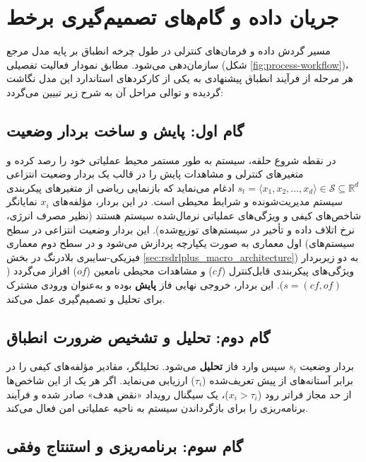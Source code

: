 \documentclass[oneside,openany,phd]{TMU-Thesis}
\begin{document}
\section{جریان داده و گام‌های تصمیم‌گیری برخط}
\label{sec:online-decision}

مسیر گردش داده و فرمان‌های کنترلی در طول چرخه انطباق بر پایه مدل مرجع  \cite{kephart2003vision} سازمان‌دهی می‌شود. مطابق نمودار فعالیت تفصیلی (شکل \ref{fig:process-workflow})، هر مرحله از فرآیند انطباق پیشنهادی به یکی از کارکردهای استاندارد این مدل نگاشت گردیده و توالی مراحل آن به شرح زیر تبیین می‌گردد:

\subsection{گام اول: پایش و ساخت بردار وضعیت}
\label{subsec:monitoring-feature}

در نقطه شروع حلقه، سیستم به طور مستمر محیط عملیاتی خود را رصد کرده و متغیرهای کنترلی و مشاهدات پایش را در قالب یک بردار وضعیت انتزاعی $s_t = \langle x_1, x_2, \dots, x_d \rangle \in \mathcal{S} \subseteq \mathbb{R}^d$ ادغام می‌نماید که بازنمایی ریاضی از متغیرهای پیکربندی سیستم مدیریت‌شونده و شرایط محیطی است. در این بردار، مؤلفه‌های $x_i$ نمایانگر شاخص‌های کیفی و ویژگی‌های عملیاتی نرمال‌شده سیستم هستند (نظیر مصرف انرژی، نرخ اتلاف داده و تأخیر در سیستم‌های توزیع‌شده). این بردار وضعیت انتزاعی در سطح اول معماری به صورت یکپارچه پردازش می‌شود و در سطح دوم معماری (سیستم‌های فیزیکی-سایبری بلادرنگ در بخش \ref{sec:rsdrlplus_macro_architecture}) به دو زیربردار ویژگی‌های پیکربندی قابل‌کنترل ($cf$) و مشاهدات محیطی نامعین ($of$) افراز می‌گردد ($s = (cf, of)$). این بردار، خروجی نهایی فاز \textbf{پایش} بوده و به‌عنوان ورودی مشترک برای تحلیل و تصمیم‌گیری عمل می‌کند.

\subsection{گام دوم: تحلیل و تشخیص ضرورت انطباق}
\label{subsec:analysis-context}

بردار وضعیت $s_t$ سپس وارد فاز \textbf{تحلیل} می‌شود. تحلیلگر، مقادیر مؤلفه‌های کیفی را در برابر آستانه‌های از پیش تعریف‌شده ($\tau_i$) ارزیابی می‌نماید. اگر هر یک از این شاخص‌ها از حد مجاز فراتر رود ($x_i > \tau_i$)، یک سیگنال رویداد «نقض هدف» صادر شده و فرآیند برنامه‌ریزی را برای بازگرداندن سیستم به ناحیه عملیاتی امن فعال می‌کند.

\subsection{گام سوم: برنامه‌ریزی و استنتاج وفقی}
\label{subsec:planning-prediction}
\end{document}
